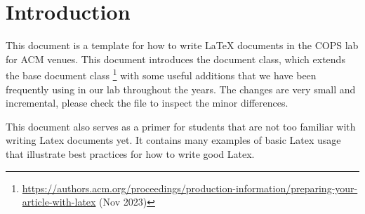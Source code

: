 \section{Introduction}
\label{sec:intro}

This document is a template for how to write LaTeX documents in the COPS lab for ACM venues.
This document introduces the  document class, which extends the base  document class%
\footnote{\url{https://authors.acm.org/proceedings/production-information/preparing-your-article-with-latex} (Nov 2023)}
with some useful additions that we have been frequently using in our lab throughout the years.
The changes are very small and incremental, please check the  file to inspect the minor differences.

This document also serves as a primer for students that are not too familiar with writing Latex documents yet.
It contains many examples of basic Latex usage that illustrate best practices for how to write good Latex.
